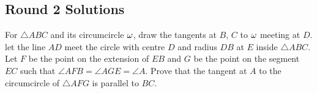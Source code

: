 \subsection{Round 2 Solutions}\label{S::2022-O-2}

\begin{resources}
\end{resources}

\begin{question}\label{A::2022-O-2-1}
    For $\triangle ABC$ and its circumcircle $\omega$, draw the tangents at $B$, $C$ to $\omega$ meeting at $D$. let the line $AD$ meet the circle with centre $D$ and radius $DB$ at $E$ inside $\triangle ABC$. Let $F$ be the point on the extension of $EB$ and $G$ be the point on the segment $EC$ such that $\angle AFB = \angle AGE = \angle A$. Prove that the tangent at $A$ to the circumcircle of $\triangle AFG$ is parallel to $BC$.
\end{question}
